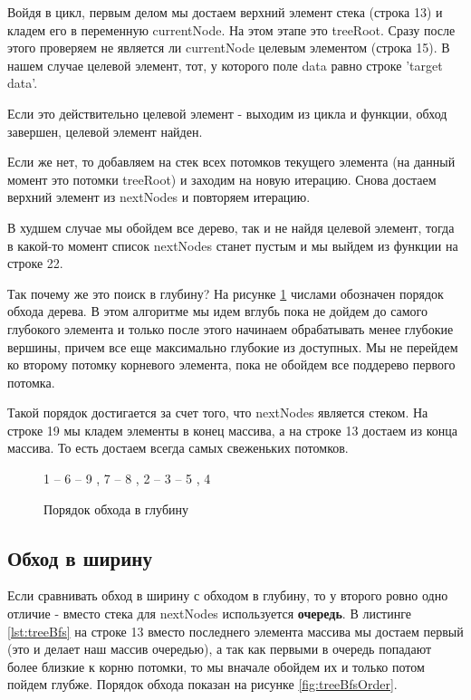 \documentclass[../article.tex]{subfiles}
\begin{document}
Войдя в цикл, первым делом мы достаем верхний элемент стека (строка 13) и кладем его в переменную {\firacodebold currentNode}. На этом этапе это {\firacodebold treeRoot}. Сразу после этого проверяем не является ли {\firacodebold currentNode} целевым элементом (строка 15). В нашем случае целевой элемент, тот, у которого поле {\firacodebold data} равно строке {\firacodebold 'target data'}.

Если это действительно целевой элемент - выходим из цикла и функции, обход завершен, целевой элемент найден.

Если же нет, то добавляем на стек всех потомков текущего элемента (на данный момент это потомки {\firacodebold treeRoot}) и заходим на новую итерацию. Снова достаем верхний элемент из {\firacodebold nextNodes} и повторяем итерацию.

В худшем случае мы обойдем все дерево, так и не найдя целевой элемент, тогда в какой-то момент список {\firacodebold nextNodes} станет пустым и мы выйдем из функции на строке 22.

Так почему же это поиск в глубину? На рисунке \ref{fig:treeDfsOrder} числами обозначен порядок обхода дерева. В этом алгоритме мы идем вглубь пока не дойдем до самого глубокого элемента и только после этого начинаем обрабатывать менее глубокие вершины, причем все еще максимально глубокие из доступных. Мы не перейдем ко второму потомку корневого элемента, пока не обойдем все поддерево первого потомка.

Такой порядок достигается за счет того, что {\firacodebold nextNodes} является стеком. На строке 19 мы кладем элементы в конец массива, а на строке 13 достаем из конца массива. То есть достаем всегда самых свеженьких потомков.

\begin{figure}
    \styledgraph
    {
        1 -- { 6 -- { 9 , 7 -- 8 }, 2 -- 3 -- { 5 , 4 }}
    }
    \caption{Порядок обхода в глубину}
    \label{fig:treeDfsOrder}
\end{figure}


\subsection{Обход в ширину}

Если сравнивать обход в ширину с обходом в глубину, то у второго ровно одно отличие - вместо стека для {\firacodebold nextNodes} используется {\bfseries очередь}. В листинге \ref{lst:treeBfs} на строке 13 вместо последнего элемента массива мы достаем первый (это и делает наш массив очередью), а так как первыми в очередь попадают более близкие к корню потомки, то мы вначале обойдем их и только потом пойдем глубже. Порядок обхода показан на рисунке \ref{fig:treeBfsOrder}.
\end{document}
